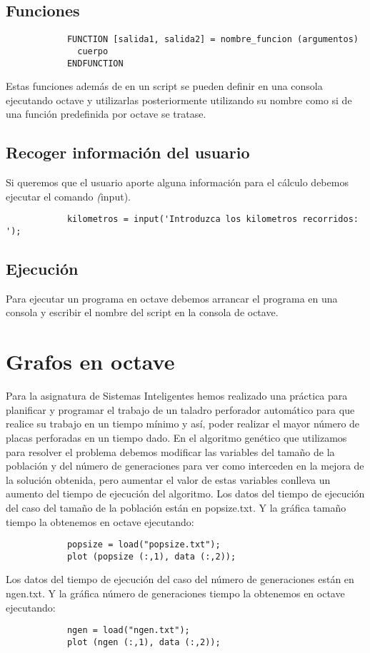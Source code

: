 \documentclass[a4,12pt,graphicx,caption,rotating]{article}
\begin{document}
\subsection{Funciones}
\begin{verbatim}
            FUNCTION [salida1, salida2] = nombre_funcion (argumentos)
              cuerpo
            ENDFUNCTION
\end{verbatim}

Estas funciones además de en un script se pueden definir en una consola ejecutando octave y utilizarlas posteriormente utilizando su nombre como si de una función predefinida por octave se tratase.
\subsection{Recoger información del usuario}
Si queremos que el usuario aporte alguna información para el cálculo debemos ejecutar el comando \emph(input).
\begin{verbatim}
            kilometros = input('Introduzca los kilometros recorridos: ');
\end{verbatim}
\subsection{Ejecución}
Para ejecutar un programa en octave debemos arrancar el programa en una consola y escribir el nombre del script en la consola de octave.

\section{Grafos en octave}
Para la asignatura de Sistemas Inteligentes hemos realizado una práctica para planificar y programar el trabajo de un taladro perforador automático para que realice su trabajo en un tiempo mínimo y así, poder realizar el mayor número de placas perforadas en un tiempo dado.
En el algoritmo genético que utilizamos para resolver el problema debemos modificar las variables del tamaño de la población y del número de generaciones para ver como interceden en la mejora de la solución obtenida, pero aumentar el valor de estas variables conlleva un aumento del tiempo de ejecución del algoritmo.
Los datos del tiempo de ejecución del caso del tamaño de la población están en popsize.txt.
Y la gráfica tamaño tiempo la obtenemos en octave ejecutando:
\begin{verbatim}
            popsize = load("popsize.txt");
            plot (popsize (:,1), data (:,2));
\end{verbatim}

Los datos del tiempo de ejecución del caso del número de generaciones están en ngen.txt.
Y la gráfica número de generaciones tiempo la obtenemos en octave ejecutando:
\begin{verbatim}
            ngen = load("ngen.txt");
            plot (ngen (:,1), data (:,2));
\end{verbatim}
\end{document}
